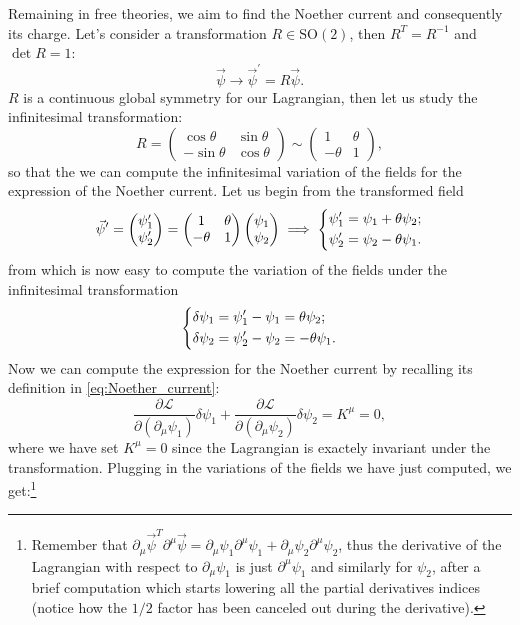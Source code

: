 Remaining in free theories, we aim to find the Noether current and consequently its charge. Let's consider a transformation \(R \in \mathrm{SO}(2)\), then \(R^T = R^{-1}\) and \(\det R = 1\):
\[
    \vec{\psi} \to \vec{\psi}^{\prime} = R \vec{\psi}.
\]
\(R\) is a continuous global symmetry for our Lagrangian, then let us study the infinitesimal transformation:
\[
    R = \begin{pmatrix}
        \cos \theta  & \sin \theta \\
        -\sin \theta & \cos \theta
    \end{pmatrix} \sim \begin{pmatrix}
        1       & \theta \\
        -\theta & 1
    \end{pmatrix},
\]
so that the we can compute the infinitesimal variation of the fields for the expression of the Noether current. Let us begin from the transformed field
\[
    \vec{\psi}^{\prime} = \begin{pmatrix}
        \psi_1^{\prime} \\
        \psi_2^{\prime}
    \end{pmatrix} = \begin{pmatrix}
        1       & \theta \\
        -\theta & 1
    \end{pmatrix}\begin{pmatrix}
        \psi_1 \\
        \psi_2
    \end{pmatrix}\implies \begin{dcases}
        \psi_1^{\prime} = \psi_1 + \theta \psi_2; \\
        \psi_2^{\prime} = \psi_2 -\theta \psi_1.
    \end{dcases}
\]
from which is now easy to compute the variation of the fields under the infinitesimal transformation
\[
    \begin{dcases}
        \delta \psi_1 = \psi_1^{\prime} -\psi_1 = \theta \psi_2; \\
        \delta \psi_2 = \psi_2^{\prime} -\psi_2 = -\theta \psi_1.
    \end{dcases}
\]
Now we can compute the expression for the Noether current by recalling its definition in \eqref{eq:Noether_current}:
\[
    \frac{\partial \mathcal{L}}{\partial(\partial_{\mu} \psi_1)} \delta \psi_1 + \frac{\partial \mathcal{L}}{\partial(\partial_{\mu} \psi_2)} \delta \psi_2 = K^{\mu} = 0,
\]
where we have set \(K^{\mu} = 0\) since the Lagrangian is exactely invariant under the transformation. Plugging in the variations of the fields we have just computed, we get:\footnote{Remember that \(\partial_\mu \vec{\psi}^T \partial^{\mu} \vec{\psi} = \partial_\mu \psi_1 \partial^{\mu} \psi_1 + \partial_\mu \psi_2 \partial^{\mu} \psi_2\), thus the derivative of the Lagrangian with respect to \(\partial_{\mu}\psi_1\) is just \(\partial^{\mu}\psi_1\) and similarly for \(\psi_2\), after a brief computation which starts lowering all the partial derivatives indices (notice how the \(1/2\) factor has been canceled out during the derivative).}
